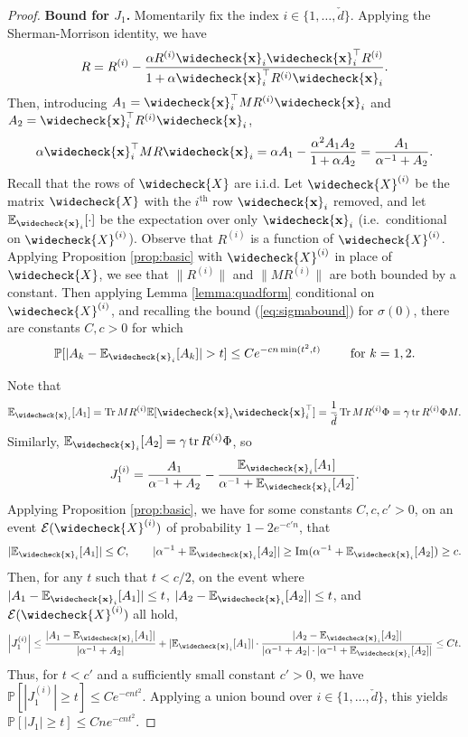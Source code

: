 \documentclass{article}
\theoremstyle{definition}
\newcommand{\E}{\mathbb{E}}
\newcommand{\Tr}{\operatorname{Tr}}
\newcommand{\tr}{\operatorname{tr}}
\renewcommand{\a}{\alpha}
\newcommand{\vd}{\check{d}}
\newcommand{\vX}{\widecheck{X}}
\renewcommand{\P}{\mathbb{P}}
\newcommand{\vx}{\widecheck{\mathbf{x}}}
\newcommand{\1}{\mathbf{1}}
\renewcommand{\Im}{\operatorname{Im}}
\newcommand{\cE}{\mathcal{E}}
\begin{document}
\begin{proof}
{\bf Bound for $J_1$.} Momentarily fix the index $i \in
\{1,\ldots,\vd\}$. Applying the Sherman-Morrison identity, we have
\begin{equation}\label{eq:Sherman-Morrison}
  R=R^{(i)}-\frac{\a R^{(i)}\vx_i\vx_i^\top R^{(i)}}{1+\a \vx_i^\top
R^{(i)}\vx_i}.
\end{equation}
Then, introducing
$A_1=\vx_i^\top MR^{(i)}\vx_i$ and $A_2=\vx_i^\top R^{(i)}\vx_i$,
\[\alpha \vx_i^\top MR \vx_i=\alpha A_1-\frac{\alpha^2 A_1A_2}{1+\alpha A_2}
=\frac{A_1}{\alpha^{-1}+A_2}.\]
Recall that the rows of $\vX$ are i.i.d. 
Let $\vX^{(i)}$ be the matrix $\vX$ with the $i^\text{th}$ row $\vx_i$
removed, and let $\E_{\vx_i}[\cdot]$ be the expectation over only $\vx_i$ (i.e.\
conditional on $\vX^{(i)}$). Observe
that $R^{(i)}$ is a function of $\vX^{(i)}$.
Applying Proposition \ref{prop:basic} with $\vX^{(i)}$ in place of $\vX$,
we see that $\|R^{(i)}\|$
and $\|MR^{(i)}\|$ are both bounded by a constant. Then applying Lemma
\ref{lemma:quadform} conditional on $\vX^{(i)}$, and recalling the bound
(\ref{eq:sigmabound}) for $\sigma(0)$, there are constants $C,c>0$ for which
\[\P[|A_k-\E_{\vx_i}[A_k]|>t]
\leq Ce^{-cn\min(t^2,t)} \qquad \text{ for } k=1,2.\]

Note that
\[\E_{\vx_i}[A_1]=\Tr MR^{(i)}\E[\vx_i\vx_i^\top]=\frac{1}{\vd}
\Tr MR^{(i)}\Phi=\gamma \tr R^{(i)}\Phi M.\]
Similarly, $\E_{\vx_i}[A_2]=\gamma \tr R^{(i)}\Phi$, so
\[J_1^{(i)}=\frac{A_1}{\alpha^{-1}+A_2}-\frac{\E_{\vx_i}[A_1]}{\alpha^{-1}+\E_{\vx_i}[A_2]}.\]
Applying Proposition \ref{prop:basic},
we have for some constants $C,c,c'>0$, on an event
$\cE(\vX^{(i)})$ of probability $1-2e^{-c'n}$, that
\[|\E_{\vx_i}[A_1]| \leq C, \qquad
|\alpha^{-1}+\E_{\vx_i}[A_2]| \geq \Im (\alpha^{-1}+\E_{\vx_i}[A_2])
\geq c.\]
Then, for any $t$ such that $t<c/2$, on the event where
$|A_1-\E_{\vx_i}[A_1]| \leq t$, $|A_2-\E_{\vx_i}[A_2]| \leq t$,
and $\cE(\vX^{(i)})$ all hold,
\begin{equation}\label{eq:J1bound}
\left|J_1^{(i)}\right|
\leq \frac{|A_1-\E_{\vx_i}[A_1]|}{|\alpha^{-1}+A_2|}+
|\E_{\vx_i}[A_1]| \cdot \frac{|A_2-\E_{\vx_i}[A_2]|}{|\alpha^{-1}+A_2| \cdot |\alpha^{-1}+\E_{\vx_i}[A_2]|} \leq Ct.
\end{equation}
Thus, for $t<c'$ and a sufficiently small constant $c'>0$,
we have $\P[|J_1^{(i)}| \geq t] \leq Ce^{-cnt^2}$.
Applying a union bound over $i \in \{1,\ldots,\vd\}$, this yields
$\P[|J_1| \geq t] \leq Cne^{-cnt^2}$.


\end{proof}
\end{document}

